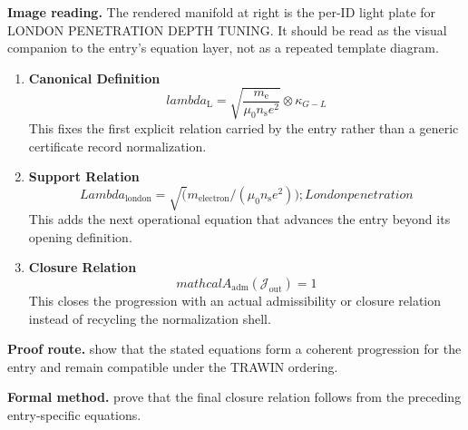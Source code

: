 \begin{samepage}
\noindent\begin{minipage}[t]{0.45\linewidth}
\vspace{0pt}
\raggedright
\scriptsize\textbf{Image reading.} The rendered manifold at right is the per-ID light plate for LONDON PENETRATION DEPTH TUNING. It should be read as the visual companion to the entry's equation layer, not as a repeated template diagram.\par
\end{minipage}\hfill
\begin{minipage}[t]{0.53\linewidth}
\vspace*{-0.10in}
\raggedright
{}
\end{minipage}
\end{samepage}

\clearpage


\begin{enumerate}[leftmargin=1.6em,itemsep=9pt,topsep=6pt]
\item \textbf{Canonical Definition}
\[
lambda_{\mathrm{L}} = \sqrt{\frac{m_{\mathrm{e}}}{\mu_0 n_{\mathrm{s}} e^2}} \otimes \kappa_{G-L}
\]
This fixes the first explicit relation carried by the entry rather than a generic certificate record normalization.

\item \textbf{Support Relation}
\[
Lambda_{\mathrm{london}} = \sqrt(m_{\mathrm{electron}}/(\mu_0 n_{\mathrm{s}} e^{2})); London penetration
\]
This adds the next operational equation that advances the entry beyond its opening definition.

\item \textbf{Closure Relation}
\[
mathcal{A}_{\mathrm{adm}}\!\left(\mathcal{J}_{\mathrm{out}}\right)=1
\]
This closes the progression with an actual admissibility or closure relation instead of recycling the normalization shell.
\end{enumerate}

\textbf{Proof route.} show that the stated equations form a coherent progression for the entry and remain compatible under the TRAWIN ordering.

\textbf{Formal method.} prove that the final closure relation follows from the preceding entry-specific equations.

